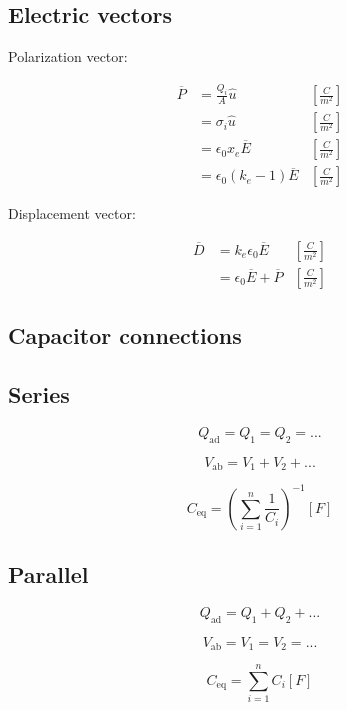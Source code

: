 \documentclass[letterpaper]{article}
\newcommand{\divline}{\noindent\makebox[\linewidth]{\rule{\textwidth}{0.4pt}}}
\begin{document}
    \divline
    \begin{multicols}{2}
        \section{Electric vectors}

        Polarization vector:

        \begin{align*}
            \overline{P} &= \frac{Q_{i}}{A} \hat{u} &\left[ \frac{C}{m^{2}} \right] \\
                &= \sigma_{i} \hat{u} &\left[ \frac{C}{m^{2}} \right] \\
                &= \epsilon_{0} x_{e} \overline{E} &\left[ \frac{C}{m^{2}} \right] \\
                &= \epsilon_{0}(k_{e} - 1) \overline{E} &\left[ \frac{C}{m^{2}} \right]
        \end{align*}

        Displacement vector:

        \begin{align*}
            \overline{D} &= k_{e} \epsilon_{0} \overline{E} &\left[ \frac{C}{m^{2}} \right] \\
                &= \epsilon_{0} \overline{E} + \overline{P} &\left[ \frac{C}{m^{2}} \right]
        \end{align*}
    \end{multicols}

    \divline
    \begin{multicols}{2}
        \section{Capacitor connections}

        \subsection{Series}

        \[Q_{\text{ad}} = Q_{1} = Q_{2} = ...\]

        \[V_{\text{ab}} = V_{1} + V_{2} + ...\]

        \[C_{\text{eq}} = \left( \sum_{i = 1}^{n} \frac{1}{C_{i}} \right)^{-1} [F]\]

        \subsection{Parallel}

        \[Q_{\text{ad}} = Q_{1} + Q_{2} + ...\]

        \[V_{\text{ab}} = V_{1} = V_{2} = ...\]

        \[C_{\text{eq}} = \sum_{i = 1}^{n} C_{i} [F]\]
        
    \end{multicols}
\end{document}
